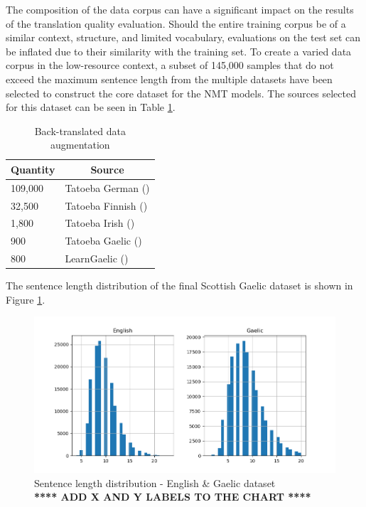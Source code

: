 The composition of the data corpus can have a significant impact on the results of the translation quality evaluation. Should the entire training corpus be of a similar context, structure, and limited vocabulary, evaluations on the test set can be inflated due to their similarity with the training set.
To create a varied data corpus in the low-resource context, a subset of 145,000 samples that do not exceed the maximum sentence length from the multiple datasets have been selected to construct the core dataset for the \acrshort{NMT} models. The sources selected for this dataset can be seen in Table \ref{tab:low_resource-data}.

\begin{table}[!ht]
\centering
\begin{tabular}{|l|l|}
\hline
\multicolumn{1}{|c|}{\textbf{Quantity}} & \multicolumn{1}{|c|}{\textbf{Source}} \\ \hline
109,000  & Tatoeba German (\cite{tatoeba_data_2020}) \\ \hline %
32,500  & Tatoeba Finnish (\cite{tatoeba_data_2020}) \\ \hline %
1,800   & Tatoeba Irish (\cite{tatoeba_data_2020}) \\ \hline
900     & Tatoeba Gaelic (\cite{tatoeba_data_2020}) \\ \hline
800     & LearnGaelic (\cite{learn_gaelic_2019}) \\ \hline
\end{tabular}
\captionsetup{justification=centering,font=Large}
\caption{Back-translated data augmentation}
\label{tab:low_resource-data}
\end{table}

The sentence length distribution of the final Scottish Gaelic dataset is shown in Figure \ref{fig:sentence_length-gaelic}.
\begin{figure}[ht!]
\centering
\includegraphics[width=1\textwidth]{media/methodology/sentence_length_gaelic.png}
\captionsetup{justification=centering,font=Large}
\caption[Diagram of the Scottish Gaelic dataset sentence length distribution]{Sentence length distribution - English \& Gaelic dataset \\ \textbf{**** ADD X AND Y LABELS TO THE CHART ****}}
\label{fig:sentence_length-gaelic}
\end{figure}



